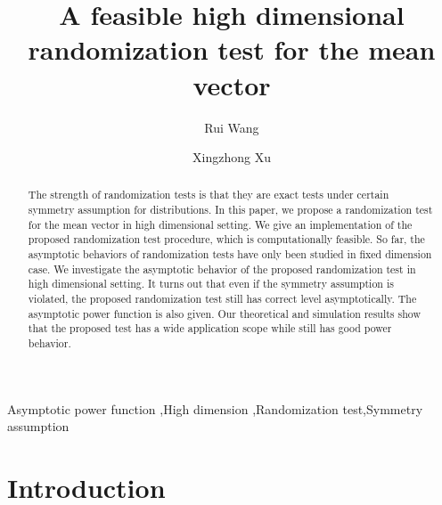 \documentclass[3p]{elsarticle}
\theoremstyle{plain}
\theoremstyle{definition}
\theoremstyle{remark}
\begin{document}
\begin{frontmatter}
\title{A feasible high dimensional randomization test for the mean vector}

\author[mymainaddress]{Rui Wang}
\author[mymainaddress,mysecondaryaddress]{Xingzhong Xu}
\address[mymainaddress]{School of Mathematics and Statistics, Beijing Institute of Technology, Beijing 100081,China}
\address[mysecondaryaddress]{Beijing Key Laboratory on MCAACI, Beijing Institute of Technology, Beijing 100081,China}

\begin{abstract}
    The strength of randomization tests is that they are exact tests under certain symmetry assumption for distributions.
    In this paper, we propose a randomization test for the mean vector in high dimensional setting. 
    We give an implementation of the proposed randomization test procedure, which is computationally feasible.
    So far, the asymptotic behaviors of randomization tests have only been studied in fixed dimension case.
    We investigate the asymptotic behavior of the proposed randomization test in high dimensional setting.
    It turns out that even if the symmetry assumption is violated, the proposed randomization test still has correct level asymptotically.
    The asymptotic power function is also given.
Our theoretical and simulation results show that the proposed test has a wide application scope while still has good power behavior.
    

\end{abstract}

\begin{keyword}
   Asymptotic power function \sep High dimension \sep Randomization test\sep Symmetry assumption
\end{keyword}
\end{frontmatter}

\section{Introduction}
\end{document}
